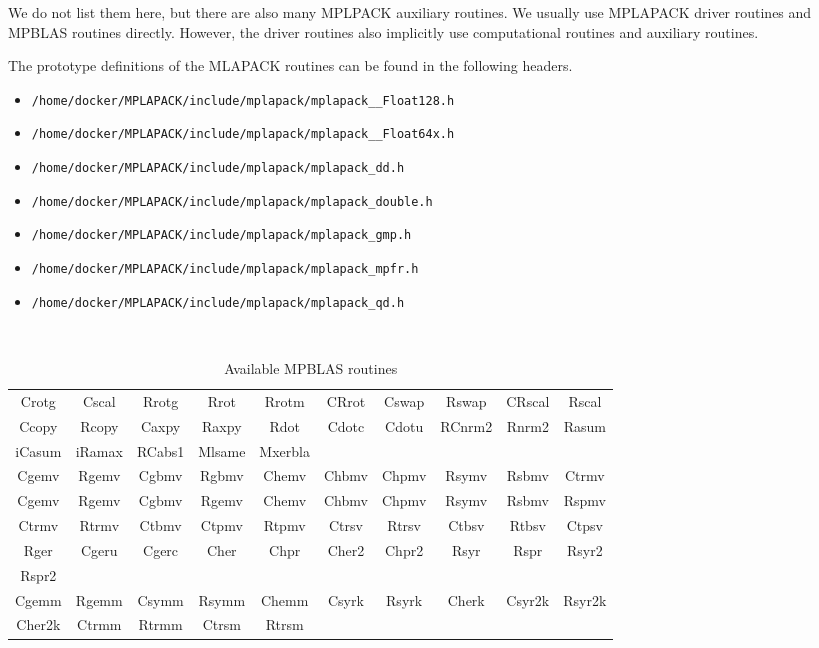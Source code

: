 \documentclass[12pt]{article}
\begin{document}
We do not list them here, but there are also many MPLPACK auxiliary routines.
We usually use MPLAPACK driver routines and MPBLAS routines directly. However, the driver routines also implicitly use computational routines and auxiliary routines.

The prototype definitions of the MLAPACK routines can be found in the following headers.
\begin{itemize}
\item {\tt /home/docker/MPLAPACK/include/mplapack/mplapack\_\_Float128.h}
\item {\tt /home/docker/MPLAPACK/include/mplapack/mplapack\_\_Float64x.h}
\item {\tt /home/docker/MPLAPACK/include/mplapack/mplapack\_dd.h}
\item {\tt /home/docker/MPLAPACK/include/mplapack/mplapack\_double.h}
\item {\tt /home/docker/MPLAPACK/include/mplapack/mplapack\_gmp.h}
\item {\tt /home/docker/MPLAPACK/include/mplapack/mplapack\_mpfr.h}
\item {\tt /home/docker/MPLAPACK/include/mplapack/mplapack\_qd.h}
\end{itemize}

\begin{table}
\caption{Available MPBLAS routines}\label{mpblasroutines}
\begin{center}
{\tt
\begin{tabular}{cccccccccc} \hline
Crotg & Cscal & Rrotg & Rrot & Rrotm & CRrot & Cswap & Rswap & CRscal & Rscal \\
Ccopy & Rcopy & Caxpy & Raxpy & Rdot & Cdotc  & Cdotu & RCnrm2 & Rnrm2 & Rasum \\
iCasum & iRamax & RCabs1& Mlsame & Mxerbla \\ \hline
Cgemv & Rgemv & Cgbmv & Rgbmv & Chemv & Chbmv & Chpmv & Rsymv & Rsbmv & Ctrmv \\
Cgemv & Rgemv & Cgbmv & Rgemv & Chemv & Chbmv & Chpmv & Rsymv & Rsbmv & Rspmv \\
Ctrmv & Rtrmv & Ctbmv & Ctpmv & Rtpmv & Ctrsv & Rtrsv & Ctbsv & Rtbsv & Ctpsv \\
Rger  & Cgeru & Cgerc & Cher  & Chpr & Cher2  & Chpr2  & Rsyr  & Rspr & Rsyr2 \\
Rspr2 \\ \hline
Cgemm & Rgemm & Csymm & Rsymm & Chemm & Csyrk  & Rsyrk & Cherk & Csyr2k& Rsyr2k \\
Cher2k& Ctrmm & Rtrmm & Ctrsm & Rtrsm\\\hline
\end{tabular}
}
\end{center}
\end{table}
\end{document}

